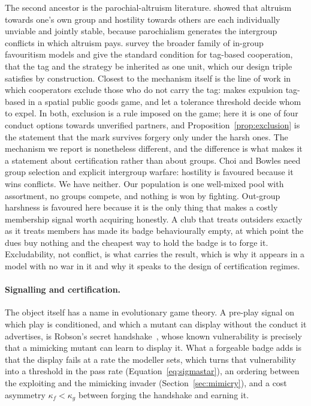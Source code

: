 \documentclass[11pt,a4paper]{article}
\theoremstyle{definition}
\begin{document}
The second ancestor is the parochial-altruism literature.
\citet{choi2007parochial} showed that altruism towards one's own group and
hostility towards others are each individually unviable and jointly stable,
because parochialism generates the
intergroup conflicts in which altruism pays. \citet{masuda2015ingroup} survey
the broader family of in-group favouritism models and give the standard
condition for tag-based cooperation, that the tag and the strategy be inherited
as one unit, which our design triple satisfies by construction. Closest to the
mechanism itself is the line of work in which cooperators exclude those who do
not carry the tag: \citet{zhang2023expulsion} makes expulsion tag-based in a
spatial public goods game, and \citet{ren2021tolerance} let a tolerance
threshold decide whom to expel. In both, exclusion is a rule imposed on the
game; here it is one of four conduct options towards unverified partners, and
Proposition~\ref{prop:exclusion} is the statement that the mark survives
forgery only under the harsh ones. The mechanism
we report is nonetheless different, and the difference is what makes it a
statement about certification rather than about groups. Choi and Bowles need
group selection and explicit intergroup warfare: hostility is favoured because
it wins conflicts. We have neither. Our population is one well-mixed pool with
assortment, no groups compete, and nothing is won by fighting. Out-group
harshness is favoured here because it is the only thing that makes a costly
membership signal worth acquiring honestly. A club that treats outsiders
exactly as it treats members has made its badge behaviourally empty, at which
point the dues buy nothing and the cheapest way to hold the badge is to forge
it. Excludability, not conflict, is what carries the result, which is why it
appears in a model with no war in it and why it speaks to the design of
certification regimes.

\paragraph{Signalling and certification.}
The object itself has a name in evolutionary game theory. A pre-play signal on
which play is conditioned, and which a mutant can display without the conduct
it advertises, is Robson's secret handshake~\citep{robson1990efficiency}, whose
known vulnerability is precisely that a mimicking mutant can learn to display
it. What a forgeable badge adds is that the display fails at a rate the
modeller sets, which turns that vulnerability into a threshold in the pass rate
(Equation~\eqref{eq:sigmastar}), an ordering between the exploiting and the
mimicking invader (Section~\ref{sec:mimicry}), and a cost asymmetry
$\kappa_f < \kappa_g$ between forging the handshake and earning it.
\end{document}
